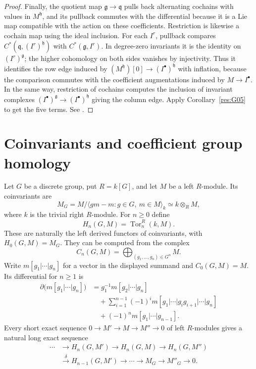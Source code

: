 \begin{proof}
Finally, the quotient map \(\mathfrak g\to\mathfrak q\) pulls
back alternating cochains with values in \(M^{\mathfrak h}\),
and its pullback commutes with the differential because it is
a Lie map compatible with the action on these coefficients.
Restriction is likewise a cochain map using the ideal inclusion.
For each \(I^r\), pullback compares
\(C^*(\mathfrak q,(I^r)^{\mathfrak h})\) with
\(C^*(\mathfrak g,I^r)\). In degree-zero invariants it is the
identity on \((I^r)^{\mathfrak g}\); the higher cohomology on
both sides vanishes by injectivity. Thus it identifies the row
edge induced by \((M^{\mathfrak h})[0]\to (I^\bullet)^{\mathfrak h}\)
with inflation, because the comparison commutes with the coefficient
augmentations induced by \(M\to I^\bullet\). In the same way,
restriction of cochains
computes the inclusion of invariant complexes
\((I^\bullet)^{\mathfrak g}\to(I^\bullet)^{\mathfrak h}\)
giving the column edge. Apply Corollary~\ref{res:G05} to get
the five terms. See \cite[Section 7.5]{weibel}.
\end{proof}

\section{Coinvariants and coefficient group homology}

\begin{theorem}
\label{res:A10}
Let \(G\) be a discrete group, put \(R=k[G]\), and let \(M\) be
a left \(R\)-module. Its coinvariants are
\[
 M_G=M/\langle gm-m:g\in G,\ m\in M\rangle_k
       \simeq k\otimes_R M,
\]
where \(k\) is the trivial right \(R\)-module. For \(n\ge0\) define
\[
 H_n(G,M)=\operatorname{Tor}^{R}_n(k,M).
\]
These are naturally the left derived functors of coinvariants,
with \(H_0(G,M)=M_G\). They can be computed from the complex
\[
 C_n(G,M)=\bigoplus_{(g_1,\ldots,g_n)\in G^n}M .
\]
Write \(m[g_1|\cdots|g_n]\) for a vector in the displayed summand
and \(C_0(G,M)=M\). Its differential for \(n\ge1\) is
\begin{align*}
 \partial\bigl(m[g_1|\cdots|g_n]\bigr)
 &=g_1^{-1}m[g_2|\cdots|g_n]\\
 &\quad+\sum_{i=1}^{n-1}(-1)^i
       m[g_1|\cdots|g_i g_{i+1}|\cdots|g_n]\\
 &\quad+(-1)^n m[g_1|\cdots|g_{n-1}].
\end{align*}
Every short exact sequence \(0\to M'\to M\to M''\to0\) of
left \(R\)-modules gives a natural long exact sequence
\begin{align*}
 \cdots &\longrightarrow H_n(G,M')\longrightarrow H_n(G,M)
       \longrightarrow H_n(G,M'')\\
 &\xrightarrow{\delta}H_{n-1}(G,M')\longrightarrow\cdots
       \longrightarrow M_G\longrightarrow M''_G\longrightarrow0 .
\end{align*}
\end{theorem}

